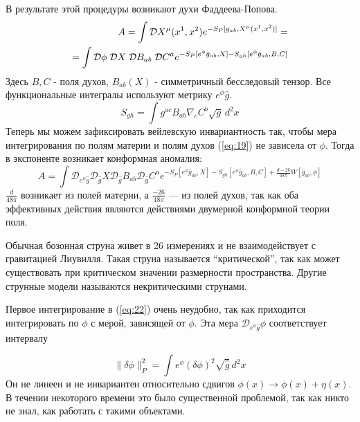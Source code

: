 \documentclass[a4paper,12pt]{article}
\theoremstyle{definition} \newtheorem{Def}{Definition}
\begin{document}
В результате этой процедуры возникают духи Фаддеева-Попова.
\begin{equation}
  \label{eq:19}
  \begin{split}
    A=\int {\cal D} X^{\mu}(x^1,x^2)e^{-S_P[g_{ab},X^{\mu}(x^1,x^2)]} = \\
    = \int {\cal D}\phi\; {\cal D}X\; \mathcal{D} B_{ab}\; \mathcal{D} C^a e^{-S_P [e^{\phi}\hat{g}_{ab},X]-
      S_{gh}[e^{\phi}\hat{g}_{ab},B,C]}
  \end{split}
\end{equation}
Здесь $B,C$ - поля духов, $B_{ab}(X)$ - симметричный бесследовый тензор. Все функциональные интегралы используют метрику $e^{\phi}\hat{g}$.
\begin{equation}
  \label{eq:21}
  S_{gh} = \int g^{ac} B_{ab} \nabla_c C^b \sqrt{g} \, d^2x
\end{equation}
Теперь мы можем зафиксировать вейлевскую инвариантность так, чтобы мера интегрирования по полям материи и полям духов  (\ref{eq:19}) не зависела от $\phi$. Тогда в экспоненте возникает конформная аномалия:
\begin{equation}
  \label{eq:22}
  A = \int \mathcal{D}_{e^{\phi} \hat{g}} \mathcal{D}_{\hat{g}} X \mathcal{D}_{\hat{g}} B_{ab} \mathcal{D}_{\hat{g}} C^a e^{-S_P [e^{\phi}\hat{g}_{ab},X]-S_{gh}[e^{\phi}\hat{g}_{ab},B,C]+\frac{d-26}{48\pi} W[\hat{g}_{ab},\phi]}
\end{equation}
$\frac{d}{48\pi}$ возникает из полей материи, а  $\frac{-26}{48\pi}$ --- из полей духов, так как оба эффективных действия являются действиями двумерной конформной теории поля.

Обычная бозонная струна живет в 26 измерениях и не взаимодействует с гравитацией Лиувилля. Такая струна называется ``критической'', так как может существовать при критическом значении размерности пространства. Другие струнные модели называются некритическими струнами.

Первое интегрирование в (\ref{eq:22}) очень неудобно, так как приходится интегрировать по $\phi$ с мерой, зависящей от $\phi$. Эта мера $\mathcal{D}_{e^{\phi}\hat{g}}\phi$ соответствует интервалу

\begin{equation}
  \label{eq:23}
  \|\delta\phi\|^2_P = \int e^{\phi} (\delta\phi)^2 \sqrt{\hat{g}}\, d^2 x
\end{equation}
Он не линеен и не инвариантен относительно сдвигов $\phi(x)\to \phi(x)+\eta(x)$.
В течении некоторого времени это было существенной проблемой, так как никто не знал, как работать с такими объектами. 
\end{document}
